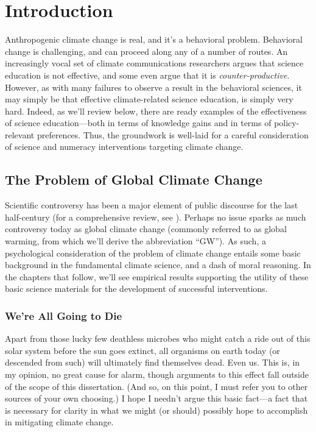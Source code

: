 \graphicspath{{intro/}}

\chapter{Introduction} \label{chap:intro}

Anthropogenic climate change is real, and it's a behavioral problem. Behavioral
change is challenging, and can proceed along any of a number of routes. An
increasingly vocal set of climate communications researchers argues that science
education is not effective, and some even argue that it is
\emph{counter-productive}.  However, as with many failures to observe a result
in the behavioral sciences, it may simply be that effective climate-related
science education, is simply very hard. Indeed, as we'll review below, there are
ready examples of the effectiveness of science education---both in terms of
knowledge gains and in terms of policy-relevant preferences. Thus, the
groundwork is well-laid for a careful consideration of science and numeracy
interventions targeting climate change.

\section{The Problem of Global Climate Change}

Scientific controversy has been a major element of public discourse for the last
half-century (for a comprehensive review, see ).
Perhaps no issue sparks as much controversy today as global climate change
(commonly referred to as global warming, from which we'll derive the
abbreviation “GW”). As such, a psychological consideration of the problem of
climate change entails some basic background in the fundamental climate science,
and a dash of moral reasoning. In the chapters that follow, we'll see empirical
results supporting the utility of these basic science materials for the
development of successful interventions.

\subsection{We're All Going to Die}

Apart from those lucky few deathless microbes who might catch a ride out of this
solar system before the sun goes extinct, all organisms on earth today (or
descended from such) will ultimately find themselves dead. Even us. This is, in
my opinion, no great cause for alarm, though arguments to this effect fall
outside of the scope of this dissertation. (And so, on this point, I must refer
you to other sources of your own choosing.) I hope I needn't argue this basic
fact---a fact that is necessary for clarity in what we might (or should)
possibly hope to accomplish in mitigating climate change.

